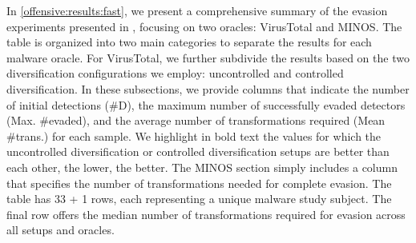 
In \autoref{offensive:results:fast}, we present a comprehensive summary of the evasion experiments presented in \cite{EVASION}, focusing on two oracles: VirusTotal and MINOS\cite{MINOS}. The table is organized into two main categories to separate the results for each malware oracle. 
For VirusTotal, we further subdivide the results based on the two diversification configurations we employ: uncontrolled and controlled diversification. 
In these subsections, we provide columns that indicate the number of initial detections (\#D), the maximum number of successfully evaded detectors (Max. \#evaded), and the average number of transformations required (Mean \#trans.) for each sample. 
We highlight in bold text the values for which the uncontrolled diversification or controlled diversification setups are better than each other, the lower, the better.
The MINOS section simply includes a column that specifies the number of transformations needed for complete evasion. 
The table has 33 + 1 rows, each representing a unique \wasm malware study subject. 
The final row offers the median number of transformations required for evasion across all setups and oracles. 

